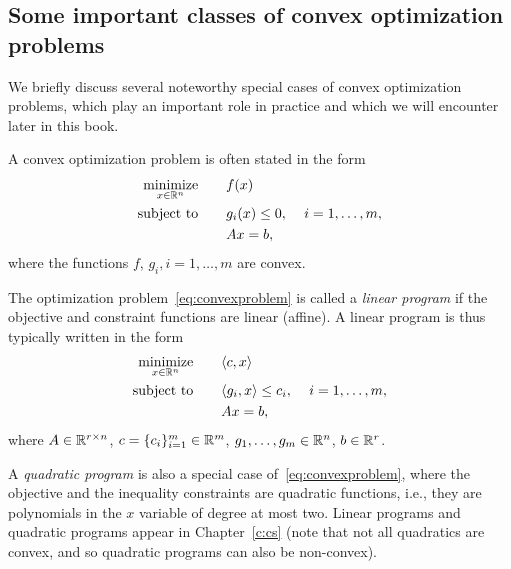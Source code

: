 \subsection{Some important classes of convex optimization problems}

We briefly discuss several noteworthy special cases of convex optimization problems, which play an important role in practice and which we will encounter later in this book.

A convex optimization problem is often stated in the form
\begin{align}\label{eq:convexproblem}
\begin{split}
 \underset{x\in\mathbb{R}^n}{\text{minimize}} & \qquad  f(x)  \\
 \text{subject to} & \qquad g_i(x) \le 0, \quad \, i = 1, \dots, m, \\
 & \qquad Ax = b,
\end{split}
\end{align}
where the functions $f$, $g_i, i=1,\dots, m$ are convex.

The optimization problem~\eqref{eq:convexproblem} is called a {\em linear program} if the objective and constraint functions  are linear (affine).
A linear program is thus typically written in the form
\begin{align}\label{eq:linprog}
\begin{split}
 \underset{x\in\mathbb{R}^n}{\text{minimize}} & \qquad   \langle c,x\rangle  \\
 \text{subject to} & \qquad \langle g_i, x\rangle  \le c_i, \quad \, i = 1, \dots, m, \\
 & \qquad Ax = b, 
\end{split}
\end{align}
where $A \in \mathbb{R}^{r \times n}$, $c = \{c_i\}_{i=1}^m \in\mathbb{R}^m$,  $g_1,\dots,g_m\in\mathbb{R}^n$, $b \in \mathbb{R}^r$. 

A {\em quadratic program} is also a special case of~\eqref{eq:convexproblem}, where the objective and the inequality
constraints are quadratic functions, i.e., they are polynomials in the $x$
variable of degree at most two. Linear programs and quadratic programs appear in Chapter~\ref{c:cs} (note that not all quadratics are convex, and so quadratic programs can also be non-convex).

